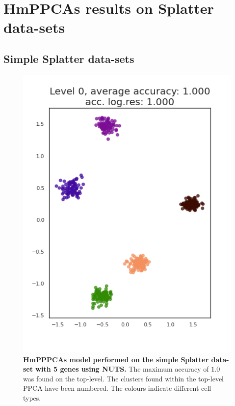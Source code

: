 \chapter{HmPPCAs results on Splatter data-sets}\label{AP:results}
\section{Simple Splatter data-sets}\label{sec:simple}

\begin{figure}
    \centering
    \includegraphics[width=.4\linewidth]{figs/simple_5_nuts.png}
    \caption[HmPPPCAs model performed on the simple Splatter data-set with 5 genes using NUTS]{\small \textbf{HmPPPCAs model performed on the simple Splatter data-set with 5 genes using NUTS.} The maximum accuracy of $1.0$ was found on the top-level. The clusters found within the top-level PPCA have been numbered. The colours indicate different cell types.}
    \label{fig:simple_5_nuts}
\end{figure}

